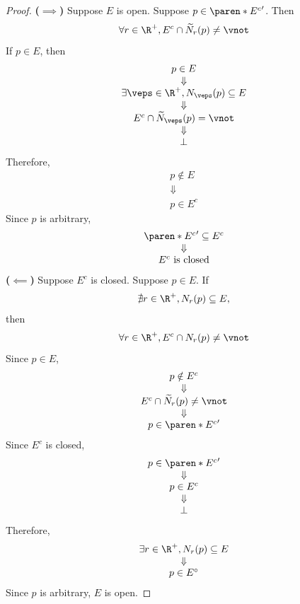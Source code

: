 \begin{proof}
  \textbf{($\implies$)} Suppose $E$ is open. Suppose $p \in \paren*{E^{c}}'$. Then
  \[
    \forall r \in \R^{+}, E^{c} \cap \widetilde{N}_{r}(p) \neq \vnot
  \]
  If $p \in E$, then
  \[
    \begin{array}{c}
      p \in E                                            \\
      \Downarrow                                         \\
      \exists \veps \in \R^{+}, N_{\veps}(p) \subseteq E \\
      \Downarrow                                         \\
      E^{c} \cap \widetilde{N}_{\veps}(p) = \vnot        \\
      \Downarrow                                         \\
      \bot
    \end{array}
  \]
  Therefore,
  \[
    \begin{array}{c}
      p \notin E \\
      \Downarrow \\
      p \in E^{c}
    \end{array}
  \]
  Since $p$ is arbitrary,
  \[
    \begin{array}{c}
      \paren*{E^{c}}' \subseteq E^{c} \\
      \Downarrow                      \\
      E^{c} \text{ is closed}
    \end{array}
  \]
  \textbf{($\impliedby$)} Suppose $E^{c}$ is closed. Suppose $p \in E$. If
  \[
    \nexists r \in \R^{+}, N_{r}(p) \subseteq E,
  \]
  then
  \[
    \forall r \in \R^{+}, E^{c} \cap N_{r}(p) \neq \vnot
  \]
  Since $p \in E$,
  \[
    \begin{array}{c}
      p \notin E^{c}                             \\
      \Downarrow                                 \\
      E^{c} \cap \widetilde{N}_{r}(p) \neq \vnot \\
      \Downarrow                                 \\
      p \in \paren*{E^{c}}'
    \end{array}
  \]
  Since $E^{c}$ is closed,
  \[
    \begin{array}{c}
      p \in \paren*{E^{c}}' \\
      \Downarrow            \\
      p \in E^{c}           \\
      \Downarrow            \\
      \bot
    \end{array}
  \]
  Therefore,
  \[
    \begin{array}{c}
      \exists r \in \R^{+}, N_{r}(p) \subseteq E \\
      \Downarrow                                 \\
      p \in E^{\circ}
    \end{array}
  \]
  Since $p$ is arbitrary, $E$ is open.
\end{proof}

